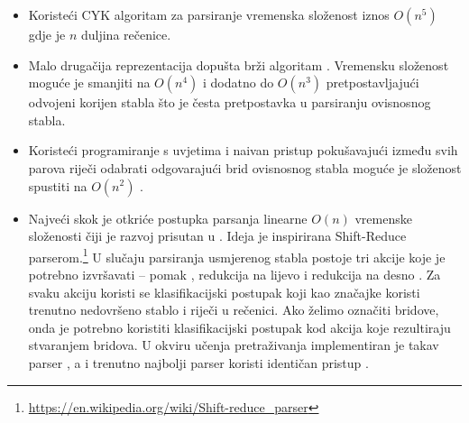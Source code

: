 \begin{itemize}
  \item Koristeći CYK algoritam za parsiranje vremenska složenost iznos $O(n^5)$
  gdje je $n$ duljina rečenice.

  \item Malo drugačija reprezentacija dopušta brži algoritam
  \citep{eisner1999efficient}. Vremensku složenost moguće je smanjiti na
  $O(n^4)$ i dodatno do $O(n^3)$ pretpostavljajući odvojeni korijen 
  stabla što je česta pretpostavka u parsiranju ovisnosnog stabla.

  \item Koristeći programiranje s uvjetima  i
  naivan pristup pokušavajući između svih parova riječi odabrati odgovarajući
  brid ovisnosnog stabla moguće je složenost spustiti na $O(n^2)$
  \citep{covington2001fundamental}.

  \item Najveći skok je otkriće postupka parsanja linearne $O(n)$ vremenske
  složenosti čiji je razvoj prisutan u \citep{nivre03efficient,
  zhang2011transition, bohnet2012transition}. Ideja je inspirirana Shift-Reduce
  parserom.\footnote{\url{https://en.wikipedia.org/wiki/Shift-reduce_parser}} U
  slučaju parsiranja usmjerenog stabla postoje tri akcije koje je potrebno
  izvršavati -- pomak , redukcija na lijevo  i
  redukcija na desno . Za svaku akciju koristi se
  klasifikacijski postupak koji kao značajke koristi trenutno nedovršeno stablo
  i riječi u rečenici. Ako želimo označiti bridove, onda je potrebno koristiti
  klasifikacijski postupak kod akcija koje rezultiraju stvaranjem bridova. U
  okviru učenja pretraživanja implementiran je takav parser
  \citep{chang2015learning}, a i trenutno najbolji parser koristi identičan
  pristup \citep{andor2016globally}.

\end{itemize}
